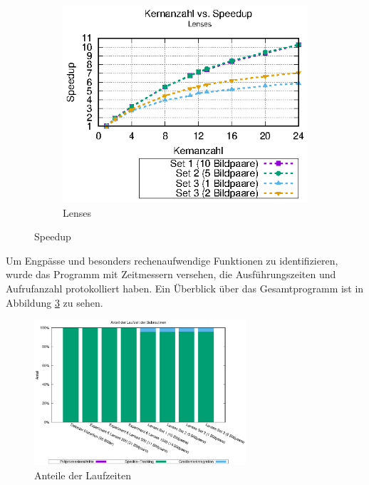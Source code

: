 \begin{center}
\begin{figure}
\begin{subfigure}[b]{0.49\textwidth}
			\includegraphics[width=\textwidth]{pdf/speedup_lenses}
			\caption[Lenses]{Lenses}
			\label{fig:speedup_lenses}
		\end{subfigure}
		\caption{Speedup}
		\label{fig:speedup}
	\end{figure}
\end{center}

Um Engpässe und besonders rechenaufwendige Funktionen zu identifizieren, wurde das Programm mit Zeitmessern versehen, die Ausführungszeiten und Aufrufanzahl protokolliert haben. Ein Überblick über das Gesamtprogramm ist in Abbildung \ref{fig:perc_main} zu sehen.

\begin{center}
	\begin{figure}[htbp]
		\centering
		\includegraphics[width=0.7\textwidth]{pdf/main}
		\caption{Anteile der Laufzeiten}
		\label{fig:perc_main}
	\end{figure}
\end{center}

